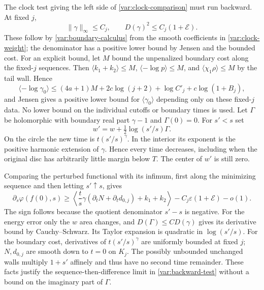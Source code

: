 \documentclass[11pt]{article}
\theoremstyle{definition}
\theoremstyle{remark}
\newcommand{\eps}{\varepsilon}
\numberwithin{equation}{section}
\begin{document}
The clock test giving the left side of \eqref{var:clock-comparison}
must run backward.  At fixed $j$,
\[
 \|\gamma\|_\infty\le C_j,\qquad
 D(\gamma)^2\le C_j(1+\mathcal E).
\]
These follow by \eqref{var:boundary-calculus} from the smooth
coefficients in \eqref{var:clock-weight}; the denominator has a
positive lower bound by Jensen and the bounded cost.
For an explicit bound, let $M$ bound the unpenalized boundary cost
along the fixed-$j$ sequences.  Then
$\langle k_1+k_2\rangle\le M$,
$\langle-\log p\rangle\le M$, and
$\langle\chi_1\rho\rangle\le M$ by the tail wall.
Hence
\[
 \langle-\log\gamma_0\rangle
 \le (4a+1)M+2c\log(j+2)+\log C'_j+c\log(1+B_j),
\]
and Jensen gives a positive lower bound for
$\langle\gamma_0\rangle$ depending only on these fixed-$j$ data.
No lower bound on the individual cutoffs or boundary times is used.
Let $\Gamma$ be holomorphic with boundary real part $\gamma-1$ and
$\Gamma(0)=0$.  For $s'<s$ set
\[
 w'=w+\tfrac12\log(s'/s)\Gamma.
\]
On the circle the new time is $t(s'/s)^\gamma$.
In the interior its exponent is the positive harmonic extension of
$\gamma$.  Hence every time decreases, including when the original
disc has arbitrarily little margin below $T$.
The center of $w'$ is still zero.

Comparing the perturbed functional with its infimum, first along the
minimizing sequence and then letting $s'\uparrow s$, gives
\begin{equation}
 \partial_s\varphi(f(0),s)
 \ge\left\langle\frac ts\gamma(\partial_tN+\partial_t d_{0,j})
                       +k_1+k_2\right\rangle
       -C_j\eps(1+\mathcal E)-o(1).
 \label{var:backward-test}
\end{equation}
The sign follows because the quotient denominator $s'-s$ is negative.
For the energy error only the $w$ area changes, and
$D(\Gamma)\le C D(\gamma)$ gives its derivative bound by
Cauchy--Schwarz.  Its Taylor expansion is quadratic in $\log(s'/s)$.
For the boundary cost, derivatives of $t(s'/s)^\gamma$ are uniformly
bounded at fixed $j$; $N,d_{0,j}$ are smooth down to $t=0$ on $K_j$.
The possibly unbounded unchanged walls multiply $1+s'$ affinely and
thus have no second time remainder.  These facts justify the
sequence-then-difference limit in \eqref{var:backward-test} without a
bound on the imaginary part of $\Gamma$.
\end{document}
